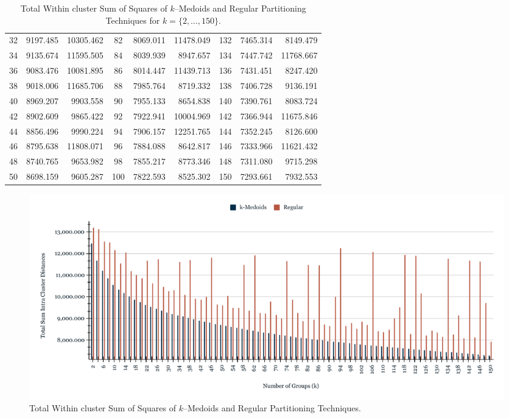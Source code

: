 \begin{table}[h]
\begin{tabular}{|c|r|r|c|r|r|c|r|r|}
		32 &  9197.485 & 10305.462 &  82 & 8069.011 & 11478.049 & 132 & 7465.314 &  8149.479 \\
		34 &  9135.674 & 11595.505 &  84 & 8039.939 &  8947.657 & 134 & 7447.742 & 11768.667 \\
		36 &  9083.476 & 10081.895 &  86 & 8014.447 & 11439.713 & 136 & 7431.451 &  8247.420 \\
		38 &  9018.006 & 11685.706 &  88 & 7985.764 &  8719.332 & 138 & 7406.728 &  9136.191 \\
		40 &  8969.207 &  9903.558 &  90 & 7955.133 &  8654.838 & 140 & 7390.761 &  8083.724 \\
		42 &  8902.609 &  9865.422 &  92 & 7922.941 & 10004.969 & 142 & 7366.944 & 11675.846 \\
		44 &  8856.496 &  9990.224 &  94 & 7906.157 & 12251.765 & 144 & 7352.245 &  8126.600 \\
		46 &  8795.638 & 11808.071 &  96 & 7884.088 &  8642.817 & 146 & 7333.966 & 11621.432 \\
		48 &  8740.765 &  9653.982 &  98 & 7855.217 &  8773.346 & 148 & 7311.080 &  9715.298 \\
		50 &  8698.159 &  9605.287 & 100 & 7822.593 &  8525.302 & 150 & 7293.661 &  7932.553 \\ \hline
		
	\end{tabular}
	\caption{Total Within cluster Sum of Squares of $k$--Medoids and Regular Partitioning Techniques for $k = \{2, \ldots, 150\}$.}
	\label{Table:TotalSumRegularkMedoids}
\end{table}

\begin{figure}[h]
	\centering
	\includegraphics[scale=0.45]{../Figures/Scaled-TotalSum-RegularKmedoids}
	\caption{Total Within cluster Sum of Squares of $k$--Medoids and Regular Partitioning Techniques.}
	\label{Fig:TotalSum-RegularKmedoids}
\end{figure}

